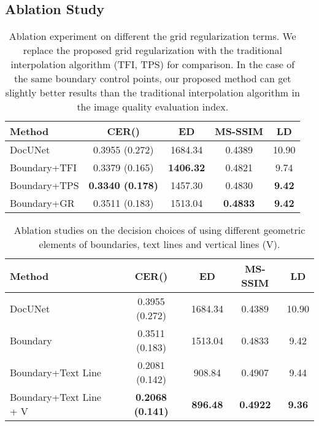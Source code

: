 \documentclass[10pt,twocolumn,letterpaper]{article}
\begin{document}
\subsection{Ablation Study}
\begin{table}
\scriptsize
  \centering
  \caption{Ablation experiment on different the grid regularization terms. We replace the proposed grid regularization with the traditional interpolation algorithm (TFI, TPS) for comparison. In the case of the same boundary control points, our proposed method can get slightly better results than the traditional interpolation algorithm in the image quality evaluation index.}
  \vspace{-2mm}
  \begin{tabular}{lcccc}
    \toprule
    \textbf{Method} &  \textbf{CER}()  & \textbf{ED}  &\textbf{MS-SSIM}  & \textbf{LD} \\
    \midrule
    DocUNet & 0.3955 (0.272) & 1684.34 & 0.4389 & 10.90\\
    Boundary+TFI & 0.3379 (0.165) & \textbf{1406.32} &0.4821& 9.74\\  
    Boundary+TPS & \textbf{0.3340 (0.178)} & 1457.30 & 0.4830 & \textbf{9.42}\\ 
    Boundary+GR  & 0.3511 (0.183) & 1513.04 & \textbf{0.4833} &  \textbf{9.42}\\ 
    \bottomrule
  \end{tabular}
  \label{tab:Ablation1}
\end{table}

\begin{table}[!t]
\scriptsize
  \centering
\caption{Ablation studies on the decision choices of using different geometric elements of boundaries, text lines and vertical lines (V).}
  \vspace{-2mm}
  \begin{tabular}{lcccc}
    \toprule
    \textbf{Method} &  \textbf{CER}()  & \textbf{ED}  &\textbf{MS-SSIM}  & \textbf{LD} \\
    \midrule
    DocUNet & 0.3955 (0.272) & 1684.34 & 0.4389 & 10.90\\
    Boundary & 0.3511 (0.183) & 1513.04 & 0.4833 & 9.42\\  
    Boundary+Text Line & 0.2081 (0.142) &908.84 & 0.4907 & 9.44\\ 
    Boundary+Text Line + V & \textbf{0.2068 (0.141)} & \textbf{896.48} & \textbf{0.4922} & \textbf{9.36}\\ 
    \bottomrule
  \end{tabular}
  \label{tab:Ablation2}
  \vspace{3mm}
\end{table}
\end{document}
